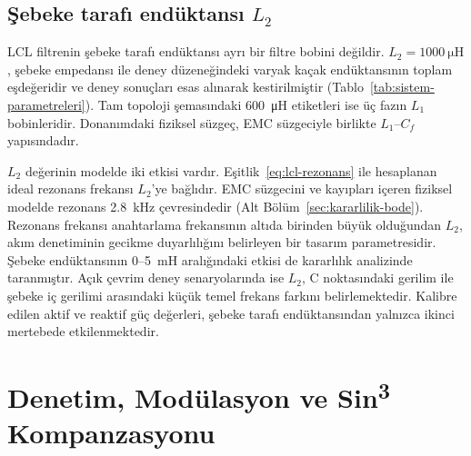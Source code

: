 \subsection{Şebeke tarafı endüktansı $L_2$}
\label{sec:l2-tanimi}

LCL filtrenin şebeke tarafı endüktansı ayrı bir filtre bobini değildir. $L_2=\SI{1000}{\micro\henry}$, şebeke empedansı ile deney düzeneğindeki varyak kaçak endüktansının toplam eşdeğeridir ve deney sonuçları esas alınarak kestirilmiştir (Tablo~\ref{tab:sistem-parametreleri}). Tam topoloji şemasındaki \SI{600}{\micro\henry} etiketleri ise üç fazın $L_1$ bobinleridir. Donanımdaki fiziksel süzgeç, EMC süzgeciyle birlikte $L_1$--$C_f$ yapısındadır.

$L_2$ değerinin modelde iki etkisi vardır. Eşitlik~\eqref{eq:lcl-rezonans} ile hesaplanan ideal rezonans frekansı $L_2$'ye bağlıdır. EMC süzgecini ve kayıpları içeren fiziksel modelde rezonans \SI{2.8}{\kilo\hertz} çevresindedir (Alt Bölüm~\ref{sec:kararlilik-bode}). Rezonans frekansı anahtarlama frekansının altıda birinden büyük olduğundan $L_2$, akım denetiminin gecikme duyarlılığını belirleyen bir tasarım parametresidir. Şebeke endüktansının \num{0}--\SI{5}{\milli\henry} aralığındaki etkisi de kararlılık analizinde taranmıştır. Açık çevrim deney senaryolarında ise $L_2$, C noktasındaki gerilim ile şebeke iç gerilimi arasındaki küçük temel frekans farkını belirlemektedir. Kalibre edilen aktif ve reaktif güç değerleri, şebeke tarafı endüktansından yalnızca ikinci mertebede etkilenmektedir.


\section{Denetim, Modülasyon ve Sin\texorpdfstring{\textsuperscript{3}}{3} Kompanzasyonu}
\label{sec:denetim-modulasyon}

